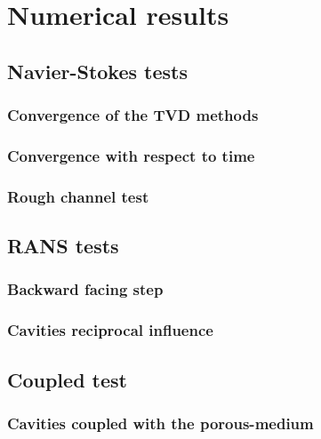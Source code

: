 \chapter{Numerical results} \label{chap:results}
\section{Navier-Stokes tests}
\subsection{Convergence of the TVD methods}
\subsection{Convergence with respect to time}
\subsection{Rough channel test}
\section{RANS tests}
\subsection{Backward facing step}
\subsection{Cavities reciprocal influence}
\section{Coupled test}
\subsection{Cavities coupled with the porous-medium}
